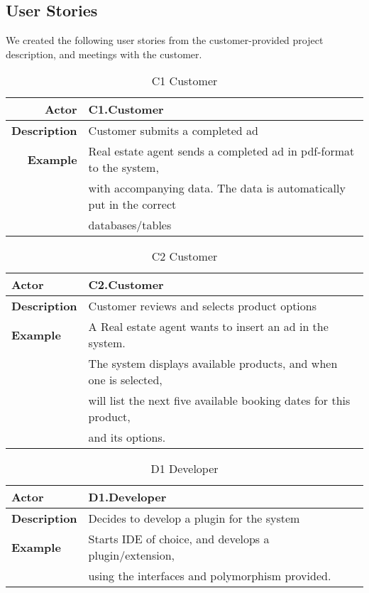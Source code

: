 \subsection{User Stories}

We created the following user stories from the customer-provided project
description, and meetings with the customer.

\begin{table}[H]
\begin{tabular}{| r | l |}
	\hline
	\textbf{Actor} & C1.Customer \\
	\hline
	\textbf{Description} & Customer submits a completed ad \\
	\hline
	\textbf{Example} & Real estate agent sends a completed ad in pdf-format to the system,\\
	& with accompanying data. The data is automatically put in the correct\\
	& databases/tables \\
	\hline
\end{tabular}
\caption{C1 Customer}
\end{table}

\begin{table}[H]
\begin{tabular}{| l | l |}
	\hline
	\textbf{Actor} & C2.Customer \\
	\hline
	\textbf{Description} & Customer reviews and selects product options \\
	\hline
	\textbf{Example} & A Real estate agent wants to insert an ad in the system.\\
	& The system displays available products, and when one is selected,\\
	& will list the next five available booking dates for this product,\\
	& and its options.\\
	\hline
\end{tabular}
\caption{C2 Customer}
\end{table}

\begin{table}[H]
\begin{tabular}{| l | l |}
	\hline
	\textbf{Actor} & D1.Developer \\
	\hline
	\textbf{Description} & Decides to develop a plugin for the system \\
	\hline
	\textbf{Example} & Starts IDE of choice, and develops a plugin/extension,\\
	& using the interfaces and polymorphism provided. \\
	\hline
\end{tabular}
\caption{D1 Developer}
\end{table}

